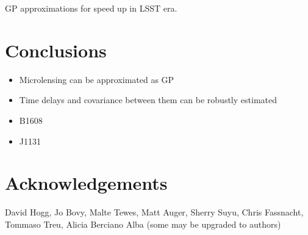 \documentclass[useAMS,usenatbib, a4paper]{mn2e} \usepackage{natbib}
\begin{document}
GP approximations for speed up in LSST era.



\section{Conclusions}

\begin{itemize}
\item Microlensing can be approximated as GP
\item Time delays and covariance between them can be robustly estimated
\item B1608
\item J1131
\end{itemize}



\section{Acknowledgements}
David Hogg, Jo Bovy, Malte Tewes, Matt Auger, Sherry Suyu, Chris Fassnacht, Tommaso Treu, Alicia Berciano Alba
(some may be upgraded to authors)

\end{document}
